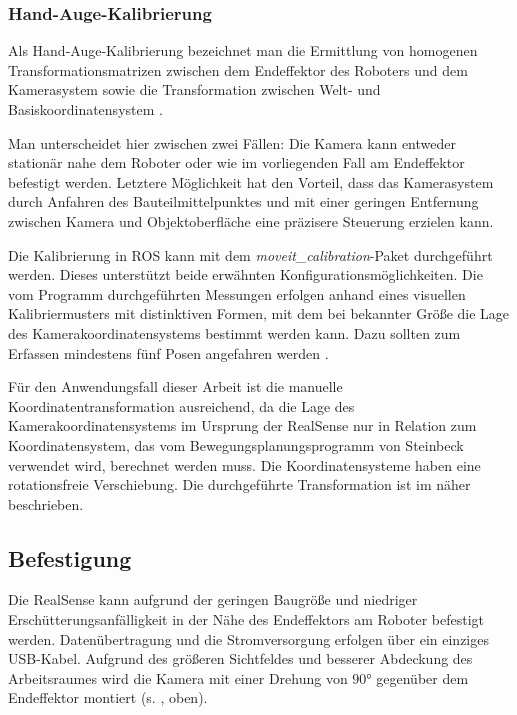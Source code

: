 \subsubsection{Hand-Auge-Kalibrierung}

Als Hand-Auge-Kalibrierung bezeichnet man die Ermittlung von homogenen Transformationsmatrizen zwischen dem Endeffektor des Roboters und dem Kamerasystem sowie die Transformation zwischen Welt- und Basiskoordinatensystem \cite[Kapitel~1]{tabb_solving_2017}.

Man unterscheidet hier zwischen zwei Fällen: Die Kamera kann entweder stationär nahe dem Roboter oder wie im vorliegenden Fall am Endeffektor befestigt werden. Letztere Möglichkeit hat den Vorteil, dass das Kamerasystem durch Anfahren des Bauteilmittelpunktes und mit einer geringen Entfernung zwischen Kamera und Objektoberfläche eine präzisere Steuerung erzielen kann.

Die Kalibrierung in \ac{ROS} kann mit dem \textit{moveit\_calibration}-Paket \cite{rauch_moveit_2022} durchgeführt werden. Dieses unterstützt beide erwähnten Konfigurationsmöglichkeiten. Die vom Programm durchgeführten Messungen erfolgen anhand eines visuellen Kalibriermusters mit distinktiven Formen, mit dem bei bekannter Größe die Lage des Kamerakoordinatensystems bestimmt werden kann. Dazu sollten zum Erfassen mindestens fünf Posen angefahren werden \cite{stechschulte_hand-eye_2022}.

Für den Anwendungsfall dieser Arbeit ist die manuelle Koordinatentransformation ausreichend, da die Lage des Kamerakoordinatensystems im Ursprung der RealSense nur in Relation zum Koordinatensystem, das vom Bewegungsplanungsprogramm von Steinbeck \cite{steinbeck_entwicklung_2022} verwendet wird, berechnet werden muss. Die Koordinatensysteme haben eine rotationsfreie Verschiebung. Die durchgeführte Transformation ist im  näher beschrieben.

\subsection{Befestigung}

Die RealSense kann aufgrund der geringen Baugröße und niedriger Erschütterungsanfälligkeit in der Nähe des Endeffektors am Roboter befestigt werden. Datenübertragung und die Stromversorgung erfolgen über ein einziges USB-Kabel. Aufgrund des größeren Sichtfeldes und besserer Abdeckung des Arbeitsraumes wird die Kamera mit einer Drehung von $90$° gegenüber dem Endeffektor montiert (s. , oben).

